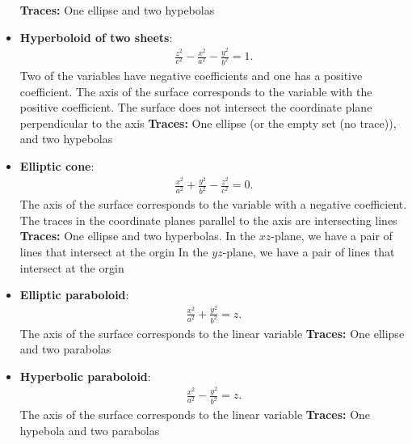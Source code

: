 \documentclass{report}
\begin{document}
\begin{itemize}
        \bigbreak \noindent 
        \bigbreak \noindent 
        \textbf{Traces:} One ellipse and two hypebolas
    \item \textbf{Hyperboloid of two sheets}:
        \begin{align*}
            \frac{z^{2}}{c^{2}} - \frac{x^{2}}{a^{2}} - \frac{y^{2}}{b^{2}} = 1
        .\end{align*}
        Two of the variables have negative coefficients and one has a positive coefficient. The axis of the surface corresponds to the variable with the positive coefficient. The surface does not intersect the coordinate plane perpendicular to the axis
        \bigbreak \noindent 
        \bigbreak \noindent 
        \textbf{Traces:} One ellipse (or the empty set (no trace)), and two hypebolas
    \item \textbf{Elliptic cone}:
        \begin{align*}
            \frac{x^{2}}{a^{2}} + \frac{y^{2}}{b^{2}} -\frac{z^{2}}{c^{2}} = 0
        .\end{align*}
        The axis of the surface corresponds to the variable with a negative coefficient. The traces in the coordinate planes parallel to the axis are intersecting lines
        \bigbreak \noindent 
        \bigbreak \noindent 
        \textbf{Traces:} One ellipse and two hyperbolas. 
        \smallbreak \noindent
        In the $xz$-plane, we have a pair of lines that intersect at the orgin
        \smallbreak \noindent
        In the $yz$-plane, we have a pair of lines that intersect at the orgin
    \item \textbf{Elliptic paraboloid}:
        \begin{align*}
            \frac{x^{2}}{a^{2} } + \frac{y^{2}}{b^{2}} = z
        .\end{align*}
        The axis of the surface corresponds to the linear variable
        \bigbreak \noindent 
        \bigbreak \noindent 
        \textbf{Traces:} One ellipse and two parabolas
    \item \textbf{Hyperbolic paraboloid}:
        \begin{align*}
            \frac{x^{2}}{a^{2} } - \frac{y^{2}}{b^{2}} = z
        .\end{align*}
        The axis of the surface corresponds to the linear variable
        \bigbreak \noindent 
        \bigbreak \noindent 
        \textbf{Traces:} One hypebola and two parabolas

    \end{itemize}
\end{document}
